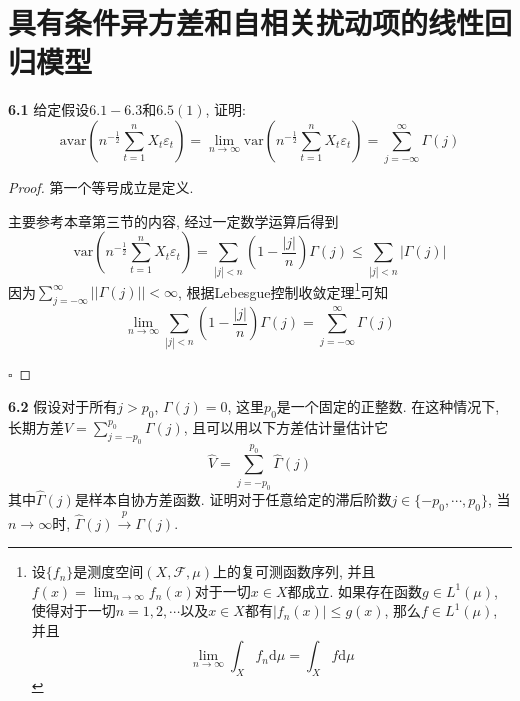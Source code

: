 \documentclass[cn,12pt,math=mtpro2,citestyle=gb7714-2015,bibstyle=gb7714-2015,twocol,mode=simple]{elegantbook}
\begin{document}
\chapter*{具有条件异方差和自相关扰动项的线性回归模型}
\textbf{6.1} 给定假设$6.1-6.3$和$6.5(1)$, 证明:
$$\text{avar}\left(n^{-\frac{1}{2}}\sum_{t=1}^{n}X_t\varepsilon_t\right)=\lim_{n\to\infty}\text{var}\left(n^{-\frac{1}{2}}\sum_{t=1}^{n}X_t\varepsilon_t\right)=\sum_{j=-\infty}^{\infty}\Gamma(j)$$
\begin{proof}
  第一个等号成立是定义.

  主要参考本章第三节的内容, 经过一定数学运算后得到
  $$\text{var}\left(n^{-\frac{1}{2}}\sum_{t=1}^{n}X_t\varepsilon_t\right)=\sum_{|j|<n}\left(1-\frac{|j|}{n}\right)\Gamma(j)\leq\sum_{|j|<n}|\Gamma(j)|$$
  因为$\displaystyle\sum_{j=-\infty}^{\infty}||\Gamma(j)||<\infty$, 根据Lebesgue控制收敛定理\footnote{设$\{f_n\}$是测度空间$(X,\mathcal{F},\mu)$上的复可测函数序列, 并且$f(x)=\displaystyle\lim_{n\to\infty}f_n(x)$对于一切$x\in X$都成立. 如果存在函数$g\in L^1(\mu)$, 使得对于一切$n=1,2,\cdots$以及$x\in X$都有$|f_n(x)|\leq g(x)$, 那么$f\in L^1(\mu)$, 并且$$\displaystyle\lim_{n\to\infty}\int_Xf_n\text{d}\mu=\int_Xf\text{d}\mu$$}可知
  $$\lim_{n\to\infty}\sum_{|j|<n}\left(1-\frac{|j|}{n}\right)\Gamma(j)=\sum_{j=-\infty}^{\infty}\Gamma(j)$$


$\square$
\end{proof}

\textbf{6.2} 假设对于所有$j>p_0$, $\Gamma(j)=0$, 这里$p_0$是一个固定的正整数. 在这种情况下, 长期方差$\displaystyle V=\sum_{j=-p_0}^{p_0}\Gamma(j)$, 且可以用以下方差估计量估计它
$$\hat{V}=\sum_{j=-p_0}^{p_0}\hat{\Gamma}(j)$$
其中$\hat{\Gamma}(j)$是样本自协方差函数. 证明对于任意给定的滞后阶数$j\in\{-p_0,\cdots,p_0\}$, 当$n\to\infty$时, $\hat{\Gamma}(j)\xrightarrow{p}\Gamma(j)$.
\end{document}
